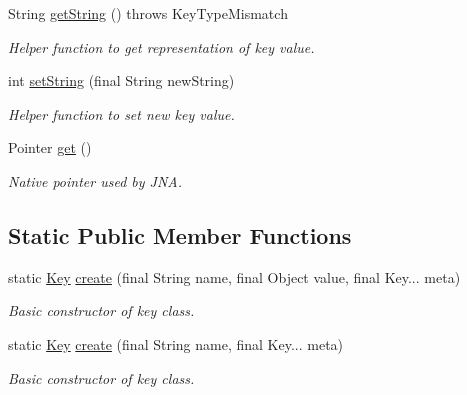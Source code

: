 \begin{DoxyCompactItemize}
String \hyperlink{classorg_1_1libelektra_1_1Key_a3464485c19d49b6763f6c831cf5ed06c}{get\+String} ()  throws Key\+Type\+Mismatch 	
\begin{DoxyCompactList}\small\item\em Helper function to get representation of key value. \end{DoxyCompactList}\item 
int \hyperlink{classorg_1_1libelektra_1_1Key_a5ccfaddf110c47c83686655a694ee76d}{set\+String} (final String new\+String)
\begin{DoxyCompactList}\small\item\em Helper function to set new key value. \end{DoxyCompactList}\item 
Pointer \hyperlink{classorg_1_1libelektra_1_1Key_a3c65267ac3d24c3eae35db576414fe4f}{get} ()
\begin{DoxyCompactList}\small\item\em Native pointer used by J\+NA. \end{DoxyCompactList}\end{DoxyCompactItemize}
\subsection*{Static Public Member Functions}
\begin{DoxyCompactItemize}
\item 
static \hyperlink{classorg_1_1libelektra_1_1Key}{Key} \hyperlink{classorg_1_1libelektra_1_1Key_a785f6b8e937d51575a4acc2ebc8f19a2}{create} (final String name, final Object value, final Key... meta)
\begin{DoxyCompactList}\small\item\em Basic constructor of key class. \end{DoxyCompactList}\item 
static \hyperlink{classorg_1_1libelektra_1_1Key}{Key} \hyperlink{classorg_1_1libelektra_1_1Key_a77ab77c48bcb237724581d914abbd7fe}{create} (final String name, final Key... meta)
\begin{DoxyCompactList}\small\item\em Basic constructor of key class. \end{DoxyCompactList}\end{DoxyCompactItemize}
